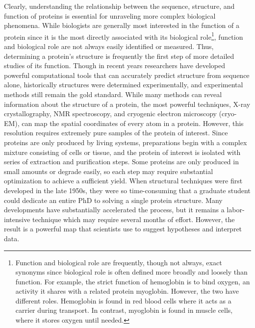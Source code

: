 Clearly, understanding the relationship between the sequence, structure, and function of proteins is essential for unraveling more complex biological phenomena. While biologists are generally most interested in the function of a protein since it is the most directly associated with its biological role\footnote{Function and biological role are frequently, though not always, exact synonyms since biological role is often defined more broadly and loosely than function. For example, the strict function of hemoglobin is to bind oxygen, an activity it shares with a related protein myoglobin. However, the two have different roles. Hemoglobin is found in red blood cells where it acts as a carrier during transport. In contrast, myoglobin is found in muscle cells, where it stores oxygen until needed.}, function and biological role are not always easily identified or measured. Thus, determining a protein's structure is frequently the first step of more detailed studies of its function. Though in recent years researchers have developed powerful computational tools that can accurately predict structure from sequence alone, historically structures were determined experimentally, and experimental methods still remain the gold standard. While many methods can reveal information about the structure of a protein, the most powerful techniques, X-ray crystallography, NMR spectroscopy, and cryogenic electron microscopy (cryo-EM), can map the spatial coordinates of every atom in a protein. However, this resolution requires extremely pure samples of the protein of interest. Since proteins are only produced by living systems, preparations begin with a complex mixture consisting of cells or tissue, and the protein of interest is isolated with series of extraction and purification steps. Some proteins are only produced in small amounts or degrade easily, so each step may require substantial optimization to achieve a sufficient yield. When structural techniques were first developed in the late 1950s, they were so time-consuming that a graduate student could dedicate an entire PhD to solving a single protein structure. Many developments have substantially accelerated the process, but it remains a labor-intensive technique which may require several months of effort. However, the result is a powerful map that scientists use to suggest hypotheses and interpret data.

